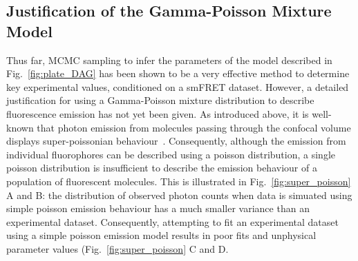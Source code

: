 \subsection{Justification of the Gamma-Poisson Mixture Model}
\label{subsec:justification}
Thus far, MCMC sampling to infer the parameters of the model described in Fig.~\ref{fig:plate_DAG} has been shown to be a very effective method to determine key experimental values, conditioned on a smFRET dataset. However, a detailed justification for using a Gamma-Poisson mixture distribution to describe fluorescence emission has not yet been given. As introduced above, it is well-known that photon emission from molecules passing through the confocal volume displays super-poissonian behaviour~\cite{chen99}. Consequently, although the emission from individual fluorophores can be described using a poisson distribution, a single poisson distribution is insufficient to describe the emission behaviour of a population of fluorescent molecules. This is illustrated in Fig.~\ref{fig:super_poisson} A and B: the distribution of observed photon counts when data is simuated using simple poisson emission behaviour has a much smaller variance than an experimental dataset. Consequently, attempting to fit an experimental dataset using a simple poisson emission model results in poor fits and unphysical parameter values (Fig.~\ref{fig:super_poisson} C and D.


